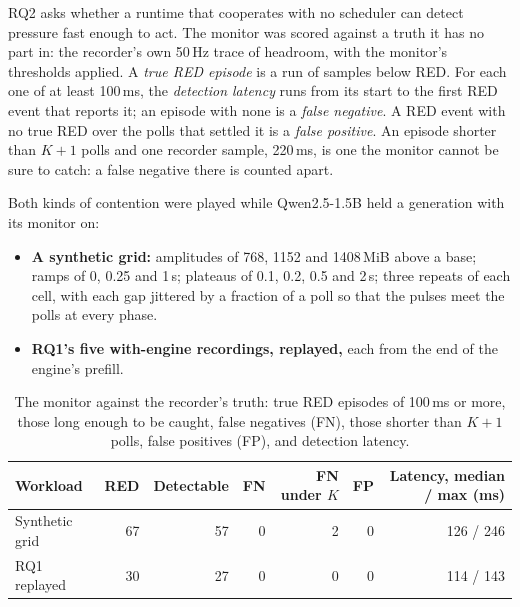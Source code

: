 \documentclass[11pt]{article}
\begin{document}
RQ2 asks whether a runtime that cooperates with no scheduler can detect pressure
fast enough to act. The monitor was scored against a truth it has no part in:
the recorder's own 50\,Hz trace of headroom, with the monitor's thresholds
applied. A \textit{true RED episode} is a run of samples below RED. For each
one of at least 100\,ms, the \textit{detection latency} runs from its start to
the first RED event that reports it; an episode with none is a \textit{false
negative}. A RED event with no true RED over the polls that settled it is a
\textit{false positive}. An episode shorter than $K+1$ polls and one recorder
sample, 220\,ms, is one the monitor cannot be sure to catch: a false negative
there is counted apart.

Both kinds of contention were played while Qwen2.5-1.5B held a generation with
its monitor on:
\begin{itemize}
\item \textbf{A synthetic grid:} amplitudes of 768, 1152 and 1408\,MiB above a
base; ramps of 0, 0.25 and 1\,s; plateaus of 0.1, 0.2, 0.5 and 2\,s; three
repeats of each cell, with each gap jittered by a fraction of a poll so that
the pulses meet the polls at every phase.
\item \textbf{RQ1's five with-engine recordings, replayed,} each from the end of
the engine's prefill.
\end{itemize}

\begin{table}[ht]
\centering
\small
\begin{tabular}{lrrrrrr}
\toprule
Workload & RED & Detectable & FN & FN under $K$ & FP & Latency, median / max (ms) \\
\midrule
Synthetic grid & 67 & 57 & 0 & 2 & 0 & 126 / 246 \\
RQ1 replayed & 30 & 27 & 0 & 0 & 0 & 114 / 143 \\
\bottomrule
\end{tabular}
\caption{The monitor against the recorder's truth: true RED episodes of
100\,ms or more, those long enough to be caught, false negatives (FN), those
shorter than $K+1$ polls, false positives (FP), and detection latency.}
\label{tab:detection}
\end{table}
\end{document}
